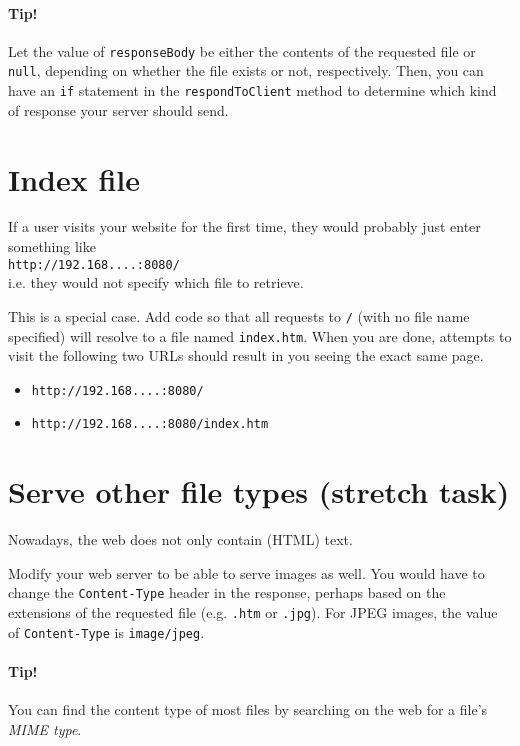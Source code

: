 \documentclass[a4paper, english]{article}
\begin{document}
        \paragraph{Tip!} Let the value of \texttt{responseBody} be either the contents of the requested file or \texttt{null}, depending on whether the file exists or not, respectively. Then, you can have an \texttt{if} statement in the \texttt{respondToClient} method to determine which kind of response your server should send.
    
    \section{Index file}
        If a user visits your website for the first time, they would probably just enter something like \\
        \texttt{http://192.168....:8080/} \\
        i.e. they would not specify which file to retrieve.
        
        This is a special case. Add code so that all requests to \texttt{/} (with no file name specified) will resolve to a file named \texttt{index.htm}. When you are done, attempts to visit the following two URLs should result in you seeing the exact same page.

        \begin{itemize}
            \item \texttt{http://192.168....:8080/}
            \item \texttt{http://192.168....:8080/index.htm}
        \end{itemize}
    
    \section{Serve other file types (stretch task)}
        Nowadays, the web does not only contain (HTML) text.
        
        Modify your web server to be able to serve images as well. You would have to change the \texttt{Content-Type} header in the response, perhaps based on the extensions of the requested file (e.g. \texttt{.htm} or \texttt{.jpg}). For JPEG images, the value of \texttt{Content-Type} is \texttt{image/jpeg}.

        \paragraph{Tip!} You can find the content type of most files by searching on the web for a file's \emph{MIME type}.
\end{document}
